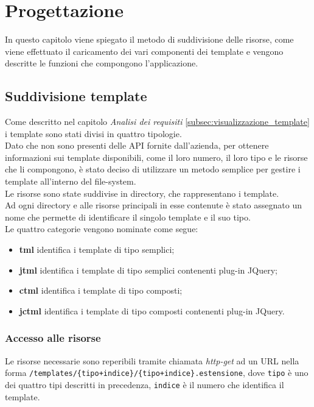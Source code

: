 
\chapter{Progettazione}
\label{cap:progettazione}
In questo capitolo viene spiegato il metodo di suddivisione delle risorse, come viene effettuato il caricamento dei vari componenti dei template e vengono descritte le funzioni che compongono l'applicazione.
\section{Suddivisione template}
Come descritto nel capitolo \textit{Analisi dei requisiti} \ref{subsec:visualizzazione_template} i template sono stati divisi in quattro tipologie.\\
Dato che non sono presenti delle API fornite dall'azienda, per ottenere informazioni sui template disponibili, come il loro numero, il loro tipo e le risorse che li compongono, è stato deciso di utilizzare un metodo semplice per gestire i template all'interno del file-system.\\
Le risorse sono state suddivise in directory, che rappresentano i template.\\
Ad ogni directory e alle risorse principali in esse contenute è stato assegnato un nome che permette di identificare il singolo template e il suo tipo.\\
Le quattro categorie vengono nominate come segue:
\begin{itemize}
	\item \textbf{tml} identifica i template di tipo semplici;
	\item \textbf{jtml} identifica i template di tipo semplici contenenti plug-in JQuery;
	\item \textbf{ctml} identifica i template di tipo composti;
	\item \textbf{jctml} identifica i template di tipo composti contenenti plug-in JQuery.
\end{itemize}
\subsection{Accesso alle risorse}
Le risorse necessarie sono reperibili tramite chiamata \textit{http-get} ad un URL nella forma \texttt{/templates/\{tipo+indice\}/\{tipo+indice\}.estensione}, dove \texttt{tipo} è uno dei quattro tipi descritti in precedenza, \texttt{indice} è il numero che identifica il template.

